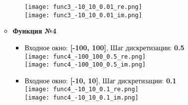\documentclass[11pt]{article}
\begin{document}
\begin{itemize}
\begin{itemize}
\begin{itemize}
					\texttt{[image: func3\_-10\_10\_0.01\_re.png]}\\
					\texttt{[image: func3\_-10\_10\_0.01\_im.png]}\\
			\end{itemize}
		\item \textbf{Функция №4}	
			\begin{itemize}
				\item Входное окно: \textbf{[-100, 100]}, Шаг дискретизации: \textbf{0.5} \medskip \\
					\texttt{[image: func4\_-100\_100\_0.5\_re.png]}\\
					\texttt{[image: func4\_-100\_100\_0.5\_im.png]}\\
				\item Входное окно: \textbf{[-10, 10]}, Шаг дискретизации: \textbf{0.1} \medskip \\
					\texttt{[image: func4\_-10\_10\_0.1\_re.png]}\\
					\texttt{[image: func4\_-10\_10\_0.1\_im.png]}\\
			\end{itemize}
	\end{itemize}
\end{itemize}
\end{document}
